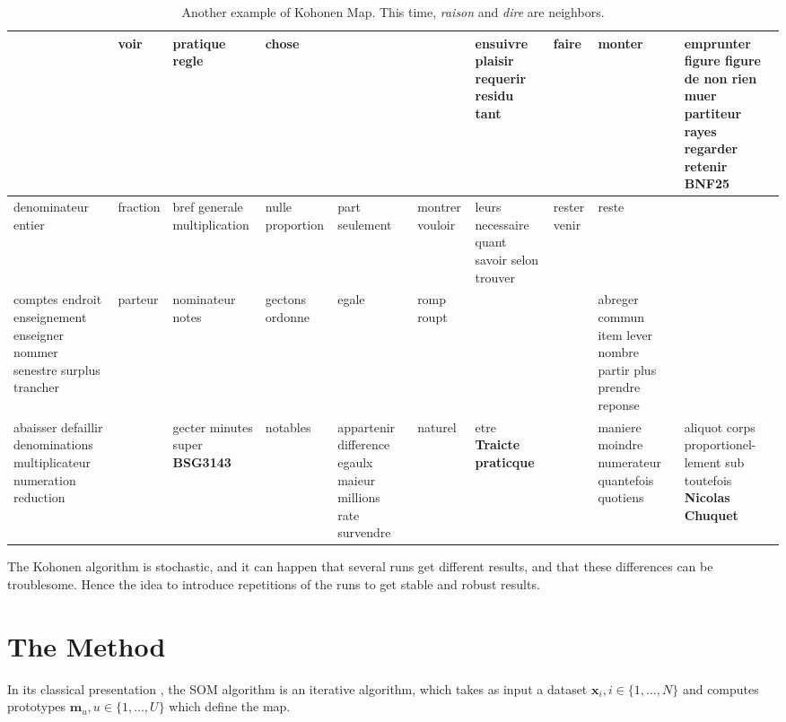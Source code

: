 \documentclass{elsarticle}
\begin{document}
\begin{table}[ht!]
{\begin{tabular}{|p{1.95cm}|p{1.9cm}|p{1.95cm}|p{1.88cm}|p{1.88cm}|p{1.88cm}|p{1.88cm}|p{1.88cm}|p{1.88cm}|p{1.88cm}|}
 & voir & pratique regle & chose & & & ensuivre plaisir requerir residu tant & faire & monter & emprunter figure figure de non rien muer partiteur rayes regarder retenir \cellcolor{grisclair} \textbf{BNF25} \\ \hline
 denominateur entier & fraction & bref generale multiplication & nulle proportion & part seulement & montrer vouloir & leurs necessaire quant savoir selon trouver & rester venir & reste & \\ \hline
 comptes endroit enseignement enseigner nommer senestre surplus trancher & parteur & nominateur notes & gectons ordonne & egale & romp roupt & & & abreger commun item lever nombre partir plus prendre reponse & \\ \hline
 abaisser defaillir denominations multiplicateur numeration reduction & & gecter minutes super \cellcolor{grisclair} \textbf{BSG3143} & notables & appartenir difference egaulx maieur millions rate survendre & naturel & etre \cellcolor{grisclair} \textbf{Traicte praticque} & & maniere moindre numerateur quantefois quotiens & aliquot corps proportionel- lement sub toutefois \cellcolor{grisclair} \textbf{Nicolas Chuquet}\\
\hline
\end{tabular}
}
\caption{Another example of Kohonen Map. This time, \textit{raison} and \textit{dire} are neighbors.}
\label{tab:koho2}
\end{table}


The Kohonen algorithm is stochastic, and it can  happen that several runs get different results, and that these differences can be troublesome. Hence the idea to introduce repetitions of the runs to get stable and robust results.

\section{The Method}\label{method}

In its classical presentation \cite{kohonen95,cottrell98}, the SOM algorithm is an iterative algorithm, which takes as input a dataset $\mathbf{x}_i, i\in\{1,\hdots,N\}$ and computes prototypes $\mathbf{m}_u, u\in\{1,\hdots,U\}$ which define the map.\\
\end{document}
